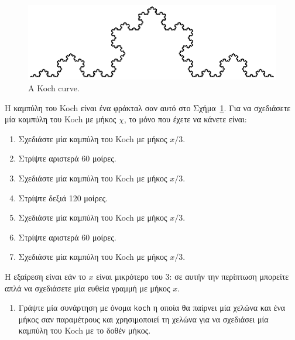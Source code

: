 \documentclass[10pt]{book}
\begin{document}
\begin{figure}
\centerline
{\includegraphics[scale=0.8]{figs/koch.pdf}}
\caption{A Koch curve.}
\label{fig.koch}
\end{figure}


\begin{exercise}

Η καμπύλη του Koch είναι ένα φράκταλ σαν αυτό
στο Σχήμα~\ref{fig.koch}. Για να σχεδιάσετε μία καμπύλη του 
Koch με μήκος $χ$, το μόνο που έχετε να κάνετε είναι:

\begin{enumerate}


\item Σχεδιάστε μία καμπύλη του  Koch  με μήκος $x/3$.

\item Στρίψτε αριστερά 60 μοίρες.

\item Σχεδιάστε μία καμπύλη του  Koch  με μήκος $x/3$.

\item Στρίψτε δεξιά 120 μοίρες.

\item Σχεδιάστε μία καμπύλη του  Koch  με μήκος $x/3$.

\item Στρίψτε αριστερά 60 μοίρες.

\item Σχεδιάστε μία καμπύλη του  Koch  με μήκος $x/3$.

\end{enumerate}

Η εξαίρεση είναι εάν το $x$ είναι μικρότερο του 3: 
σε αυτήν την περίπτωση μπορείτε απλά να σχεδιάσετε μία ευθεία
γραμμή με μήκος $x$.

\begin{enumerate}

\item Γράψτε μία συνάρτηση με όνομα  {\tt koch}  η οποία θα παίρνει
μία χελώνα και ένα μήκος σαν παραμέτρους και χρησιμοποιεί τη χελώνα για να
σχεδιάσει μία καμπύλη του  Koch  με το δοθέν μήκος.


\end{enumerate}
\end{exercise}
\end{document}
